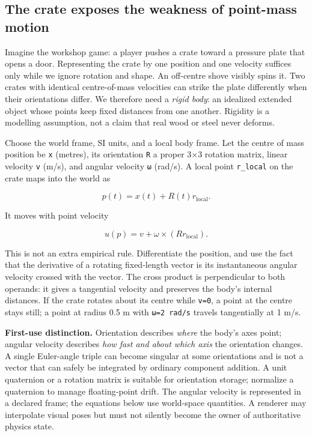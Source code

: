 \subsection{The crate exposes the weakness of point-mass motion}\label{02-foundations-ii-ch039-the-crate-exposes-the-weakness-of-point-mass-motion}

Imagine the workshop game: a player pushes a crate toward a pressure plate that opens a door. Representing the crate by one position and one velocity suffices only while we ignore rotation and shape. An off-centre shove visibly spins it. Two crates with identical centre-of-mass velocities can strike the plate differently when their orientations differ. We therefore need a \emph{rigid body}: an idealized extended object whose points keep fixed distances from one another. Rigidity is a modelling assumption, not a claim that real wood or steel never deforms.

Choose the world frame, SI units, and a local body frame. Let the centre of mass position be \texttt{x} (metres), its orientation \texttt{R} a proper 3×3 rotation matrix, linear velocity \texttt{v} (m/s), and angular velocity \texttt{ω} (rad/s). A local point \texttt{r\_local} on the crate maps into the world as

\[
p(t)=x(t)+R(t)r_{\mathrm{local}}.
\]

It moves with point velocity

\[
u(p)=v+\omega\times(Rr_{\mathrm{local}}).
\]

This is not an extra empirical rule. Differentiate the position, and use the fact that the derivative of a rotating fixed-length vector is its instantaneous angular velocity crossed with the vector. The cross product is perpendicular to both operands: it gives a tangential velocity and preserves the body's internal distances. If the crate rotates about its centre while \texttt{v=0}, a point at the centre stays still; a point at radius 0.5 m with \texttt{\textbar{}ω\textbar{}=2\ rad/s} travels tangentially at 1 m/s.

\textbf{First-use distinction.} Orientation describes \emph{where} the body's axes point; angular velocity describes \emph{how fast and about which axis} the orientation changes. A single Euler-angle triple can become singular at some orientations and is not a vector that can safely be integrated by ordinary component addition. A unit quaternion or a rotation matrix is suitable for orientation storage; normalize a quaternion to manage floating-point drift. The angular velocity is represented in a declared frame; the equations below use world-space quantities. A renderer may interpolate visual poses but must not silently become the owner of authoritative physics state.

